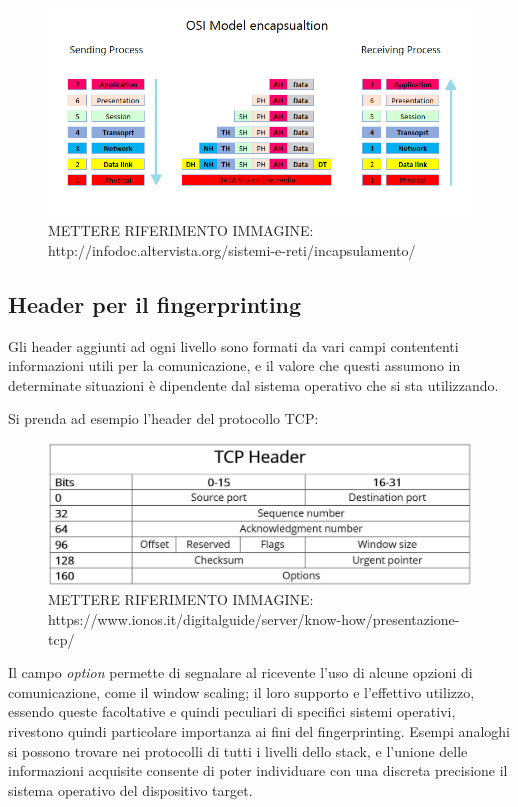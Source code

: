 \begin{figure}[h]
	\includegraphics[width=\textwidth]{figures/incapsulamento.png}
	\caption{METTERE RIFERIMENTO IMMAGINE: http://infodoc.altervista.org/sistemi-e-reti/incapsulamento/}
	\label{incapsulamento}
\end{figure}

\subsection{Header per il fingerprinting}
Gli header aggiunti ad ogni livello sono formati da vari campi contententi informazioni utili per la comunicazione, e il valore che questi assumono in determinate situazioni è dipendente dal sistema operativo che si sta utilizzando.

Si prenda ad esempio l'header del protocollo TCP:\\

\begin{figure}[h]
	\includegraphics[width=\textwidth]{figures/headerTCP.JPG}
	\caption{METTERE RIFERIMENTO IMMAGINE: https://www.ionos.it/digitalguide/server/know-how/presentazione-tcp/}
	\label{headerTCP}
\end{figure}

Il campo \textit{option} permette di segnalare al ricevente l'uso di alcune opzioni di comunicazione, come il window scaling; il loro supporto e l'effettivo utilizzo, essendo queste facoltative e quindi peculiari di specifici sistemi operativi, rivestono quindi particolare importanza ai fini del fingerprinting.
Esempi analoghi si possono trovare nei protocolli di tutti i livelli dello stack, e l'unione delle informazioni acquisite consente di poter individuare con una discreta precisione il sistema operativo del dispositivo target.




